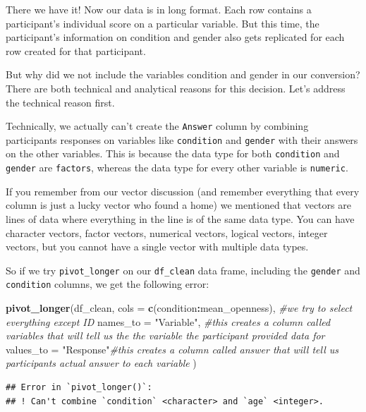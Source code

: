\documentclass[
]{book}
\newenvironment{Shaded}{\begin{snugshade}}{\end{snugshade}}
\newcommand{\AttributeTok}[1]{\textcolor[rgb]{0.13,0.29,0.53}{#1}}
\newcommand{\CommentTok}[1]{\textcolor[rgb]{0.56,0.35,0.01}{\textit{#1}}}
\newcommand{\FunctionTok}[1]{\textcolor[rgb]{0.13,0.29,0.53}{\textbf{#1}}}
\newcommand{\NormalTok}[1]{#1}
\newcommand{\SpecialCharTok}[1]{\textcolor[rgb]{0.81,0.36,0.00}{\textbf{#1}}}
\newcommand{\StringTok}[1]{\textcolor[rgb]{0.31,0.60,0.02}{#1}}
\begin{document}
There we have it! Now our data is in long format. Each row contains a participant's individual score on a particular variable. But this time, the participant's information on condition and gender also gets replicated for each row created for that participant.

But why did we not include the variables condition and gender in our conversion? There are both technical and analytical reasons for this decision. Let's address the technical reason first.

Technically, we actually can't create the \texttt{Answer} column by combining participants responses on variables like \texttt{condition} and \texttt{gender} with their answers on the other variables. This is because the data type for both \texttt{condition} and \texttt{gender} are \texttt{factors}, whereas the data type for every other variable is \texttt{numeric}.

If you remember from our vector discussion (and remember everything that every column is just a lucky vector who found a home) we mentioned that vectors are lines of data where everything in the line is of the same data type. You can have character vectors, factor vectors, numerical vectors, logical vectors, integer vectors, but you cannot have a single vector with multiple data types.

So if we try \texttt{pivot\_longer} on our \texttt{df\_clean} data frame, including the \texttt{gender} and \texttt{condition} columns, we get the following error:

\begin{Shaded}
\begin{Highlighting}[]
\FunctionTok{pivot\_longer}\NormalTok{(df\_clean,}
  \AttributeTok{cols =} \FunctionTok{c}\NormalTok{(condition}\SpecialCharTok{:}\NormalTok{mean\_openness), }\CommentTok{\#we try to select everything except ID}
  \AttributeTok{names\_to =} \StringTok{"Variable"}\NormalTok{, }\CommentTok{\#this creates a column called \textasciigrave{}variables\textasciigrave{} that will tell us the the variable the participant provided data for}
  \AttributeTok{values\_to =} \StringTok{"Response"}\CommentTok{\#this creates a column called \textasciigrave{}answer\textasciigrave{} that will tell us participants actual answer to each variable}
\NormalTok{)}
\end{Highlighting}
\end{Shaded}

\begin{verbatim}
## Error in `pivot_longer()`:
## ! Can't combine `condition` <character> and `age` <integer>.
\end{verbatim}
\end{document}
